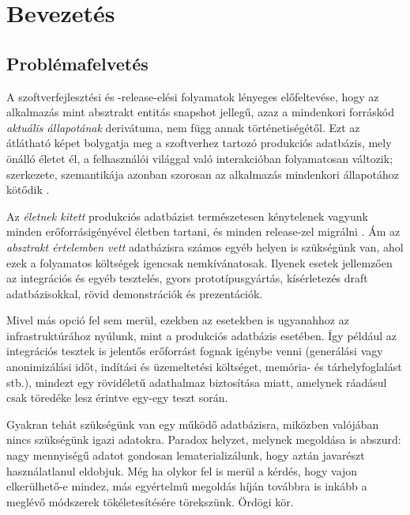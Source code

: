 \documentclass[
    parspace,
    noindent,
    nohyp,
]{elteiktdk}[2023/04/10]
\begin{document}
\chapter{Bevezetés}

\section{Problémafelvetés}

A szoftverfejlesztési és -release-elési folyamatok lényeges előfeltevése,
hogy az alkalmazás mint absztrakt entitás snapshot jellegű,
azaz a mindenkori forráskód \textit{aktuális állapotának} derivátuma,
nem függ annak történetiségétől.
Ezt az átlátható képet bolygatja meg a szoftverhez tartozó produkciós adatbázis,
mely önálló életet él, a felhasználói világgal való interakcióban folyamatosan változik;
szerkezete, szemantikája azonban szorosan az alkalmazás mindenkori állapotához kötődik%
\cite{Ploski2007DatabaseCentricVersioning,Fluri2023DatabaseCiCd,Edwards2023LiveLocalSchemaChange}.

Az \textit{életnek kitett} produkciós adatbázist természetesen kénytelenek vagyunk
minden erőforrásigényével életben tartani, és minden release-zel migrálni%
\cite{Sacco2023Migrating,SoftwareFlyway,SoftwareLiquibase}.
Ám az \textit{absztrakt értelemben vett} adatbázisra számos egyéb helyen is szükségünk van,
ahol ezek a folyamatos költségek igencsak nemkívánatosak.
Ilyenek esetek jellemzően az integrációs és egyéb tesztelés, gyors prototípusgyártás,
kísérletezés draft adatbázisokkal, rövid demonstrációk és prezentációk.

Mivel más opció fel sem merül, ezekben az esetekben is ugyanahhoz az infrastruktúrához nyúlunk,
mint a produkciós adatbázis esetében.
Így például az integrációs tesztek is jelentős erőforrást fognak igénybe venni
(generálási vagy anonimizálási időt, indítási  és üzemeltetési költséget, memória- és tárhelyfoglalást stb.),
mindezt egy rövidéletű adathalmaz biztosítása miatt,
amelynek ráadásul csak töredéke lesz érintve egy-egy teszt során.

Gyakran tehát szükségünk van egy működő adatbázisra,
miközben valójában nincs szükségünk igazi adatokra.
Paradox helyzet, melynek megoldása is abszurd: nagy mennyiségű adatot
gondosan lematerializálunk, hogy aztán javarészt használatlanul eldobjuk.
Még ha olykor fel is merül a kérdés, hogy vajon elkerülhető-e mindez,
más egyértelmű megoldás híján továbbra is inkább a meglévő módszerek tökéletesítésére törekszünk.
Ördögi kör.
\end{document}
